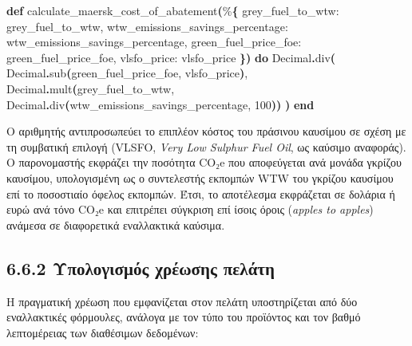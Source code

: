 \documentclass[11pt,a4paper,greek,twoside]{template-xe}
\newenvironment{Shaded}{\begin{english}\begin{snugshade}}{\end{snugshade}\end{english}}
\newcommand{\ConstantTok}[1]{\textcolor[rgb]{0.56,0.35,0.01}{#1}}
\newcommand{\DecValTok}[1]{\textcolor[rgb]{0.00,0.00,0.81}{#1}}
\newcommand{\FunctionTok}[1]{\textcolor[rgb]{0.13,0.29,0.53}{\textbf{#1}}}
\newcommand{\KeywordTok}[1]{\textcolor[rgb]{0.13,0.29,0.53}{\textbf{#1}}}
\newcommand{\NormalTok}[1]{#1}
\newcommand{\OperatorTok}[1]{\textcolor[rgb]{0.81,0.36,0.00}{\textbf{#1}}}
\newcommand{\VariableTok}[1]{\textcolor[rgb]{0.00,0.00,0.00}{#1}}
\begin{document}
\begin{Shaded}
\begin{Highlighting}[]
\KeywordTok{def}\NormalTok{ calculate\_maersk\_cost\_of\_abatement}\FunctionTok{(}\NormalTok{\%}\FunctionTok{\{}
      \VariableTok{grey\_fuel\_to\_wtw:}\NormalTok{ grey\_fuel\_to\_wtw,}
      \VariableTok{wtw\_emissions\_savings\_percentage:}\NormalTok{ wtw\_emissions\_savings\_percentage,}
      \VariableTok{green\_fuel\_price\_foe:}\NormalTok{ green\_fuel\_price\_foe,}
      \VariableTok{vlsfo\_price:}\NormalTok{ vlsfo\_price}
    \FunctionTok{\})} \KeywordTok{do}
  \ConstantTok{Decimal}\OperatorTok{.}\NormalTok{div}\FunctionTok{(}
    \ConstantTok{Decimal}\OperatorTok{.}\NormalTok{sub}\FunctionTok{(}\NormalTok{green\_fuel\_price\_foe, vlsfo\_price}\FunctionTok{)}\NormalTok{,}
    \ConstantTok{Decimal}\OperatorTok{.}\NormalTok{mult}\FunctionTok{(}\NormalTok{grey\_fuel\_to\_wtw, }\ConstantTok{Decimal}\OperatorTok{.}\NormalTok{div}\FunctionTok{(}\NormalTok{wtw\_emissions\_savings\_percentage, }\DecValTok{100}\FunctionTok{))}
  \FunctionTok{)}
\KeywordTok{end}
\end{Highlighting}
\end{Shaded}

Ο αριθμητής αντιπροσωπεύει το επιπλέον κόστος του πράσινου καυσίμου σε
σχέση με τη συμβατική επιλογή (VLSFO, \emph{Very Low Sulphur Fuel Oil},
ως καύσιμο αναφοράς). Ο παρονομαστής εκφράζει την ποσότητα CO₂e που
αποφεύγεται ανά μονάδα γκρίζου καυσίμου, υπολογισμένη ως ο συντελεστής
εκπομπών WTW του γκρίζου καυσίμου επί το ποσοστιαίο όφελος εκπομπών.
Έτσι, το αποτέλεσμα εκφράζεται σε δολάρια ή ευρώ ανά τόνο CO₂e και
επιτρέπει σύγκριση επί ίσοις όροις (\emph{apples to apples}) ανάμεσα σε
διαφορετικά εναλλακτικά καύσιμα.

\subsection{6.6.2 Υπολογισμός χρέωσης
πελάτη}\label{ux3c5ux3c0ux3bfux3bbux3bfux3b3ux3b9ux3c3ux3bcux3ccux3c2-ux3c7ux3c1ux3adux3c9ux3c3ux3b7ux3c2-ux3c0ux3b5ux3bbux3acux3c4ux3b7}

Η πραγματική χρέωση που εμφανίζεται στον πελάτη υποστηρίζεται από δύο
εναλλακτικές φόρμουλες, ανάλογα με τον τύπο του προϊόντος και τον βαθμό
λεπτομέρειας των διαθέσιμων δεδομένων:
\end{document}
